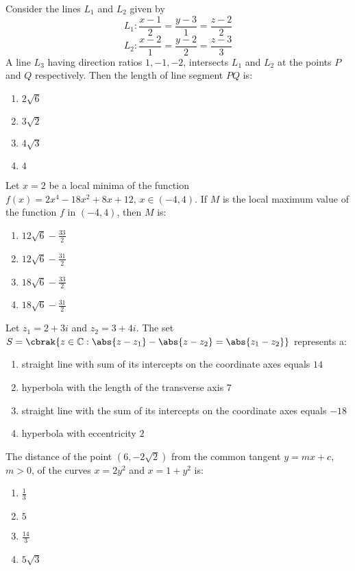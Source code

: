 \item Consider the lines $L_1$ and $L_2$ given by
\[
L_1: \frac{x-1}{2} = \frac{y-3}{1} = \frac{z-2}{2}
\]
\[
L_2: \frac{x-2}{1} = \frac{y-2}{2} = \frac{z-3}{3}
\]
A line $L_3$ having direction ratios $1, -1, -2$, intersects $L_1$ and $L_2$ at the points $P$ and $Q$ respectively. Then the length of line segment $PQ$ is:
\begin{enumerate}
    \item $2\sqrt{6}$
    \item $3\sqrt{2}$
    \item $4\sqrt{3}$
    \item $4$
\end{enumerate}

\item Let $x = 2$ be a local minima of the function 
$f(x) = 2x^4 - 18x^2 + 8x + 12, \, x \in (-4, 4)$. 
If $M$ is the local maximum value of the function $f$ in $(-4, 4)$, then $M$ is:
\begin{enumerate}
    \item $12\sqrt{6} - \frac{33}{2}$
    \item $12\sqrt{6} - \frac{31}{2}$
    \item $18\sqrt{6} - \frac{33}{2}$
    \item $18\sqrt{6} - \frac{31}{2}$
\end{enumerate}

\item Let $z_1 = 2 + 3i$ and $z_2 = 3 + 4i$. The set 
$S=\cbrak{z \in \mathbb{C}: \abs{z-z_1}-\abs{z-z_2}=\abs{z_1-z_2}}$
represents a:
\begin{enumerate}
    \item straight line with sum of its intercepts on the coordinate axes equals $14$
    \item hyperbola with the length of the transverse axis $7$
    \item straight line with the sum of its intercepts on the coordinate axes equals $-18$
    \item hyperbola with eccentricity $2$
\end{enumerate}
\item The distance of the point $\left( 6, -2\sqrt{2} \right)$ from the common tangent $y = mx + c$, $m > 0$, of the curves $x = 2y^2$ and $x = 1 + y^2$ is:
\begin{enumerate}
    \item $\frac{1}{3}$
    \item $5$
    \item $\frac{14}{3}$
    \item $5\sqrt{3}$
\end{enumerate}

